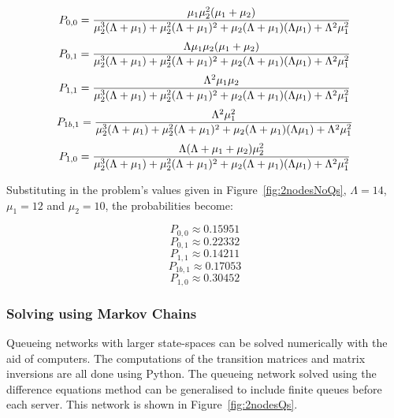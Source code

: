 \documentclass{article}
\begin{document}
\begin{equation*}
    P_{0,0} = {{\mu_1\mu_2^2(\mu_1+\mu_2)}\over{\mu_2^3(\Lambda+\mu_1) + \mu_2^2(\Lambda+\mu_1)^2 + \mu_2(\Lambda+\mu_1)(\Lambda\mu_1) + \Lambda^2\mu_1^2}}
\end{equation*}
\begin{equation*}
    P_{0,1} = {{\Lambda\mu_1\mu_2(\mu_1+\mu_2)}\over{\mu_2^3(\Lambda+\mu_1) + \mu_2^2(\Lambda+\mu_1)^2 + \mu_2(\Lambda+\mu_1)(\Lambda\mu_1) + \Lambda^2\mu_1^2}}
\end{equation*}
\begin{equation*}
    P_{1,1} = {{\Lambda^2\mu_1\mu_2}\over{\mu_2^3(\Lambda+\mu_1) + \mu_2^2(\Lambda+\mu_1)^2 + \mu_2(\Lambda+\mu_1)(\Lambda\mu_1) + \Lambda^2\mu_1^2}}
\end{equation*}
\begin{equation*}
    P_{1b,1} = {{\Lambda^2\mu_1^2}\over{\mu_2^3(\Lambda+\mu_1) + \mu_2^2(\Lambda+\mu_1)^2 + \mu_2(\Lambda+\mu_1)(\Lambda\mu_1) + \Lambda^2\mu_1^2}}
\end{equation*}
\begin{equation*}
    P_{1,0} = {{\Lambda(\Lambda+\mu_1+\mu_2)\mu_2^2}\over{\mu_2^3(\Lambda+\mu_1) + \mu_2^2(\Lambda+\mu_1)^2 + \mu_2(\Lambda+\mu_1)(\Lambda\mu_1) + \Lambda^2\mu_1^2}}
\end{equation*}

Substituting in the problem's values given in Figure~\ref{fig:2nodesNoQs}, $\Lambda = 14$, $\mu_1 = 12$ and $\mu_2 = 10$, the probabilities become:

\begin{equation*}
    P_{0,0} \approx 0.15951
\end{equation*}
\begin{equation*}
    P_{0,1} \approx 0.22332
\end{equation*}
\begin{equation*}
    P_{1,1} \approx 0.14211
\end{equation*}
\begin{equation*}
    P_{1b,1} \approx 0.17053
\end{equation*}
\begin{equation*}
    P_{1,0} \approx 0.30452
\end{equation*}



\subsubsection{Solving using Markov Chains}
Queueing networks with larger state-spaces can be solved numerically with the aid of computers.
The computations of the transition matrices and matrix inversions are all done using Python.
The queueing network solved using the difference equations method can be generalised to include finite queues before each server.
This network is shown in Figure~\ref{fig:2nodesQs}.
\end{document}
